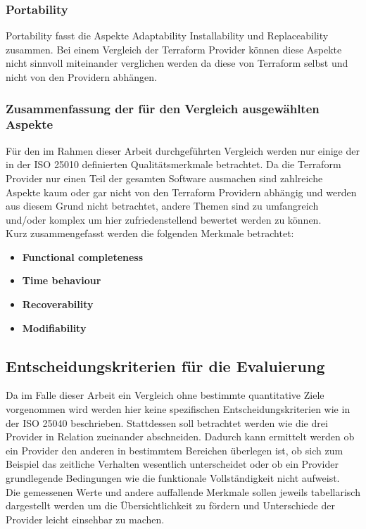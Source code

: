\begin{spacing}{1.2}
\subsubsection{Portability}

Portability fasst die Aspekte Adaptability Installability und
Replaceability zusammen. Bei einem Vergleich der Terraform Provider
können diese Aspekte nicht sinnvoll miteinander verglichen werden da
diese von Terraform selbst und nicht von den Providern abhängen.


\subsubsection{Zusammenfassung der für den Vergleich ausgewählten Aspekte}

Für den im Rahmen dieser Arbeit durchgeführten Vergleich werden nur
einige der in der ISO 25010 definierten Qualitätsmerkmale betrachtet.
Da die Terraform Provider nur einen Teil der gesamten Software ausmachen
sind zahlreiche Aspekte kaum oder gar nicht von den Terraform Providern
abhängig und werden aus diesem Grund nicht betrachtet, andere Themen
sind zu umfangreich und/oder komplex um hier zufriedenstellend
bewertet werden zu können.\\
Kurz zusammengefasst werden die folgenden Merkmale betrachtet:

\begin{itemize}
  \item \textbf{Functional completeness}
  \item \textbf{Time behaviour}
  \item \textbf{Recoverability}
  \item \textbf{Modifiability}
\end{itemize}

\subsection{Entscheidungskriterien für die Evaluierung}

Da im Falle dieser Arbeit ein Vergleich ohne bestimmte quantitative
Ziele vorgenommen wird werden hier keine spezifischen
Entscheidungskriterien wie in der ISO 25040 beschrieben. Stattdessen
soll betrachtet werden wie die drei Provider in Relation zueinander
abschneiden. Dadurch kann ermittelt werden ob ein Provider den anderen
in bestimmtem Bereichen überlegen ist, ob sich zum Beispiel das
zeitliche Verhalten wesentlich unterscheidet oder ob ein Provider
grundlegende Bedingungen wie die funktionale Vollständigkeit nicht
aufweist.\\
Die gemessenen Werte und andere auffallende Merkmale sollen jeweils
tabellarisch dargestellt werden um die Übersichtlichkeit zu fördern
und Unterschiede der Provider leicht einsehbar zu machen.


\end{spacing}
